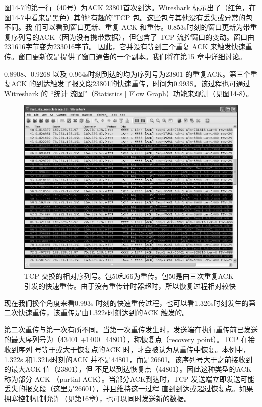 图14-7的第一行（40号）为ACK 23801首次到达。Wireshark
标示出了（红色，在图14-7中看来是黑色）其他“有趣的”TCP 包。这些包与其他没有丢失或异常的包不同。我
们可以看到窗口更新、重复 ACK 和重传。0.853s时刻的窗口更新为带重复序列号的ACK（因为没有携带数据），但包含了 TCP
流控窗口的变动。窗口由231616字节变为233016字节。
因此，它并没有等到三个重复 ACK 来触发快速重传。窗口更新仅是提供了窗口通告的一个副本。我们将在第15 章中详细讨论。

0.8908、0.9268 以及 0.964s时刻到达的均为序列号为23801 的重复ACK。第三个重复ACK
的到达触发了报文段23801的快速重传，时间为0.993S。该过程也可通过 Witreshark 的
“统计|流图”（Statistics | Flow Graph）功能来观测（见图14-8）。

\begin{figure}[!htb]
\includegraphics[width=1.0\textwidth]{imgs/14/14-7.png}
\caption{TCP 交换的相对序列号。包50和66为重传。包50是由三次重复ACK 引发的快速重传。由于没有重传计时器超时，所以恢复过程相对较快}
\end{figure}

现在我们换个角度来看0.993s 时刻的快速重传过程，也可以看1.326s时刻发生的第二次快速重传，该重传是由1.322s时刻达到的ACK 触发的。

第二次重传与第一次有所不同。当第一次重传发生时，发送端在执行重传前已发送的最大序列号为（43401
+1400=44801），称恢复点（recovery point）。TCP 在接收到序列
号等于或大于恢复点的ACK 时，才会被认为从重传中恢复。本例中，1.322s 和1.321s时刻的ACK
并不是44801，而是26601。该序列号大于之前接收到的最大ACK 值（23801），但
不足以到达恢复点（44801）。因此这种类型的ACK 称为部分 ACK （partial ACK）。当部分ACK到达时，TCP
发送端立即发送可能丢失的报文段（这里是26601），并且维持这一过程
直到到达或超过恢复点。如果拥塞控制机制允许（见第16章），也可以同时发送新的数据。


